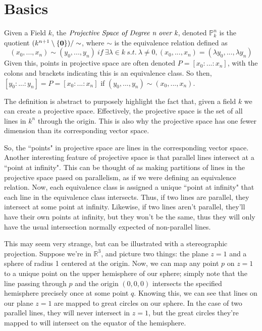 \section{Basics}

\begin{mydef}
Given a Field $k$, the $\emph{Projective Space of Degree n over k}$, denoted $\mathbb{P}^n_k$
is the quotient $(k^{n+1} \setminus \{\bold{0}\}) / \sim$, where $\sim$ is the equivalence relation 
defined as 
\[
(x_0, ..., x_n) \sim (y_0, ..., y_n)~if~\exists \lambda \in k~s.t.~\lambda \neq 0,
(x_0, ..., x_n) = (\lambda y_0, ..., \lambda y_n)
\]
Given this, points in projective space are often denoted $P = [ x_0 : ... : x_n]$,
with the colons and brackets indicating this is an equivalence class. So then,
$[ y_0: ... : y_n ] = P = [ x_0 : ... : x_n ]$ if $(y_0, ..., y_n) \sim (x_0, ..., x_n)$.
\end{mydef}
The definition is abstract to purposely highlight the fact that, 
given a field $k$ we can create a projective space.
Effectively, the projective space is the set of all lines in 
$k^n$ through the origin. This is also why the projective space
has one fewer dimension than its corresponding vector space.

So, the ``points" in projective space are lines in the corresponding
vector space. Another interesting feature of projective space is
that parallel lines intersect at a ``point at infinity". This can
be thought of as making partitions of lines in the projective space
pased on parallelism, as if we were defining an equivalence relation.
Now, each equivalence class is assigned a unique ``point at infinity"
that each line in the equivalence class intersects. Thus, if two lines
are parallel, they intersect at some point at infinity. Likewise, if
two lines aren't parallel, they'll have their own points at infinity,
but they won't be the same, thus they will only have the usual intersection
normally expected of non-parallel lines.

This may seem very strange, but can be illustrated with a stereographic
projection. Suppose we're in $\mathbb{R}^3$, and picture two things:
the plane $z=1$ and a sphere of radius 1 centered at the origin.
Now, we can map any point $p$ on $z=1$ to a unique point on the upper
hemisphere of our sphere; simply note that the line passing through
$p$ and the origin $(0, 0, 0)$ intersects the specified hemisphere
precisely once at some point $q$. Knowing this, we can see that lines
on our plane $z=1$ are mapped to great circles on our sphere. In the
case of two parallel lines, they will never intersect in $z=1$, but
the great circles they're mapped to will intersect on the equator of 
the hemisphere.

